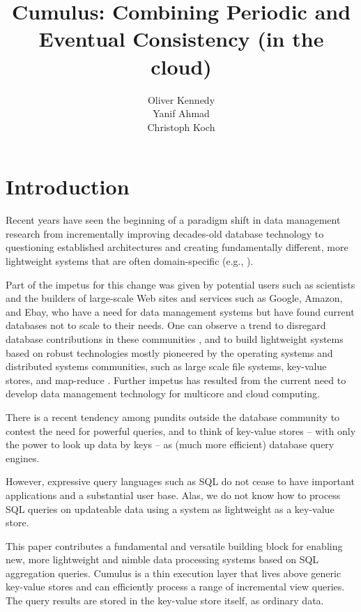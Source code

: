 \documentclass{vldb}
\title{Cumulus: Combining Periodic and Eventual Consistency (in the cloud)}
\author{
\alignauthor
Oliver Kennedy\\
  \affaddr{Cornell University}
  \affaddr{okennedy@cs.cornell.edu}
\alignauthor
Yanif Ahmad\\
  \affaddr{Cornell University}
  \affaddr{yanif@cs.cornell.edu}
\alignauthor
Christoph Koch\\
  \affaddr{Cornell University}
  \affaddr{koch@cs.cornell.edu}
}
\date{}
\begin{document}
\maketitle

\begin{abstract}

\end{abstract}

\section{Introduction}

Recent years have seen the beginning of a paradigm shift in data management research from incrementally improving decades-old database technology to questioning established architectures  and creating fundamentally different, more lightweight systems that are often domain-specific (e.g.,
\cite{DBLP:conf/vldb/StonebrakerMAHHH07,DBLP:journals/pvldb/KallmanKNPRZJMSZHA08}).

Part of the impetus for this change was given by potential users such as scientists and the builders of large-scale Web sites and services such as Google, Amazon, and Ebay, who have a need for data management systems but have found current databases not to scale to their needs. One can observe a trend to disregard database contributions in these communities \cite{dbcolumn, DBLP:conf/sigmod/PavloPRADMS09}, and to build lightweight systems based on robust technologies mostly pioneered by the operating systems and distributed systems communities, such as large scale file systems, key-value stores, and map-reduce \cite{DBLP:journals/cacm/DeanG08, DBLP:journals/tocs/ChangDGHWBCFG08}. Further impetus has resulted from the current need to develop data management technology for multicore and cloud computing.

There is a recent tendency among pundits outside the database community to contest the need for powerful queries, and to think of key-value stores -- with only the power to look up data by keys -- as (much more efficient) database query engines.

However, expressive query languages such as SQL do not cease to have important applications and a substantial user base. Alas, we do not know how to process SQL queries on updateable data using a system as lightweight as a key-value store.

This paper contributes a fundamental and versatile building block for enabling new, more lightweight and nimble data processing systems based on SQL aggregation queries.  Cumulus is a thin execution layer that lives above generic key-value stores and can efficiently process a range of incremental view queries.  The query results are stored in the key-value store itself, as ordinary data. 
\end{document}
